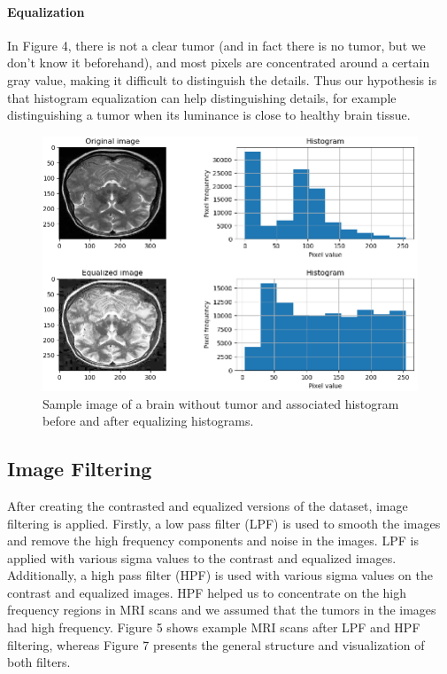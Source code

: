 \documentclass[conference]{IEEEtran}
\begin{document}
\paragraph*{Equalization}
In Figure 4, there is not a clear tumor (and in fact there is no tumor, but we don't know it beforehand), and most pixels are concentrated around a certain gray value, making it difficult to distinguish the details. Thus our hypothesis is that histogram equalization can help distinguishing details, for example distinguishing a tumor when its luminance is close to healthy brain tissue. \\
\begin{figure}[h]
\centering
\includegraphics[scale=0.33]{figures/Equalizing.png}
\caption{Sample image of a brain without tumor and associated histogram before and after equalizing histograms.}
\end{figure}

\subsection{Image Filtering}
After creating the contrasted and equalized versions of the dataset, image filtering is applied. Firstly, a low pass filter (LPF) is used to smooth the images and remove the high frequency components and noise in the images. LPF is applied with various sigma values to the contrast and equalized images. Additionally, a high pass filter (HPF) is used with various sigma values on the contrast and equalized images. HPF helped us to concentrate on the high frequency regions in MRI scans and we assumed that the tumors in the images had high frequency. Figure 5 shows example MRI scans after LPF and HPF filtering, whereas Figure 7 presents the general structure and visualization of both filters. 
\end{document}

